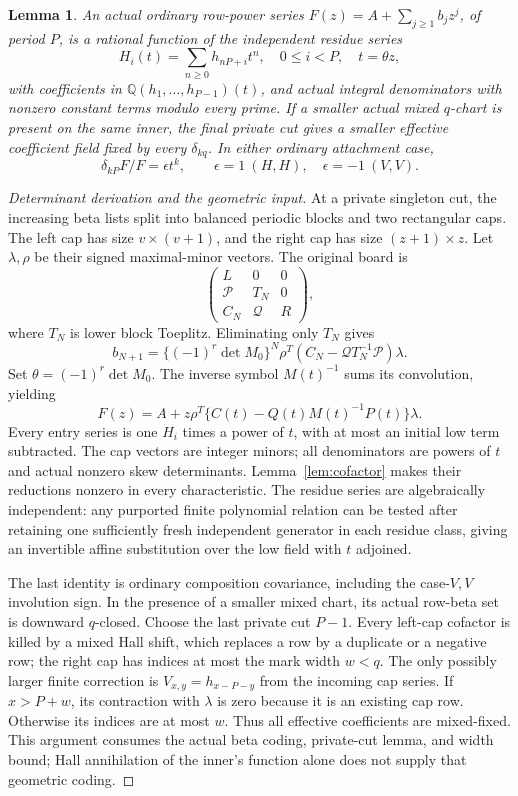 \documentclass[11pt,a4paper]{amsart}
\numberwithin{equation}{section}
\theoremstyle{plain}
\newtheorem{lemma}[theorem]{Lemma}
\theoremstyle{definition}
\begin{document}
\begin{lemma}\label{lem:ordinary-transfer}
An actual ordinary row-power series \(F(z)=A+\sum_{j\ge1}b_jz^j\), of period \(P\), is a rational function of the independent residue series
\[
 H_i(t)=\sum_{n\ge0}h_{nP+i}t^n,\quad0\le i<P,\quad t=\theta z,
\]
with coefficients in \(\mathbb Q(h_1,\ldots,h_{P-1})(t)\), and actual integral denominators with nonzero constant terms modulo every prime.  If a smaller actual mixed \(q\)-chart is present on the same inner, the final private cut gives a smaller effective coefficient field fixed by every \(\delta_{kq}\).  In either ordinary attachment case,
\[
 \delta_{kP}F/F=\epsilon t^k,\qquad\epsilon=1\ (H,H),\quad\epsilon=-1\ (V,V).
\]
\end{lemma}
\begin{proof}[Determinant derivation and the geometric input]
At a private singleton cut, the increasing beta lists split into balanced periodic blocks and two rectangular caps.  The left cap has size \(v\times(v+1)\), and the right cap has size \((z+1)\times z\).  Let \(\lambda,\rho\) be their signed maximal-minor vectors.  The original board is
\[
 \begin{pmatrix}L&0&0\\ \mathcal P&T_N&0\\ C_N&\mathcal Q&R\end{pmatrix},
\]
where \(T_N\) is lower block Toeplitz.  Eliminating only \(T_N\) gives
\[
 b_{N+1}=\{(-1)^r\det M_0\}^N
 \rho^T(C_N-\mathcal Q T_N^{-1}\mathcal P)\lambda.
\]
Set \(\theta=(-1)^r\det M_0\).  The inverse symbol \(M(t)^{-1}\) sums its convolution, yielding
\[
 F(z)=A+z\rho^T\{C(t)-Q(t)M(t)^{-1}P(t)\}\lambda.
\]
Every entry series is one \(H_i\) times a power of \(t\), with at most an initial low term subtracted.  The cap vectors are integer minors; all denominators are powers of \(t\) and actual nonzero skew determinants.  Lemma~\ref{lem:cofactor} makes their reductions nonzero in every characteristic.  The residue series are algebraically independent: any purported finite polynomial relation can be tested after retaining one sufficiently fresh independent generator in each residue class, giving an invertible affine substitution over the low field with \(t\) adjoined.

The last identity is ordinary composition covariance, including the case-\(V,V\) involution sign.  In the presence of a smaller mixed chart, its actual row-beta set is downward \(q\)-closed.  Choose the last private cut \(P-1\).  Every left-cap cofactor is killed by a mixed Hall shift, which replaces a row by a duplicate or a negative row; the right cap has indices at most the mark width \(w<q\).  The only possibly larger finite correction is \(V_{x,y}=h_{x-P-y}\) from the incoming cap series.  If \(x>P+w\), its contraction with \(\lambda\) is zero because it is an existing cap row.  Otherwise its indices are at most \(w\).  Thus all effective coefficients are mixed-fixed.  This argument consumes the actual beta coding, private-cut lemma, and width bound; Hall annihilation of the inner's function alone does not supply that geometric coding.
\end{proof}
\end{document}
